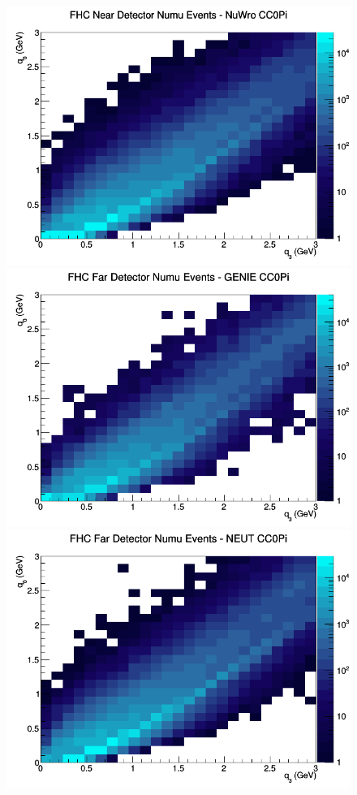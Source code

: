 \documentclass[12pt]{article}
\begin{document}
\begin{figure}[h]
\includegraphics[width=\linewidth]{eff_q0_q3/GAr/CC0Pi_FHC_ND_numu_q3_q0_NuWro.png}
\endminipage
\newline
{}
\includegraphics[width=\linewidth]{eff_q0_q3/GAr/CC0Pi_FHC_FD_numu_q3_q0_GENIE.png}
\endminipage
{}
\includegraphics[width=\linewidth]{eff_q0_q3/GAr/CC0Pi_FHC_FD_numu_q3_q0_NEUT.png}

\end{figure}
\end{document}
